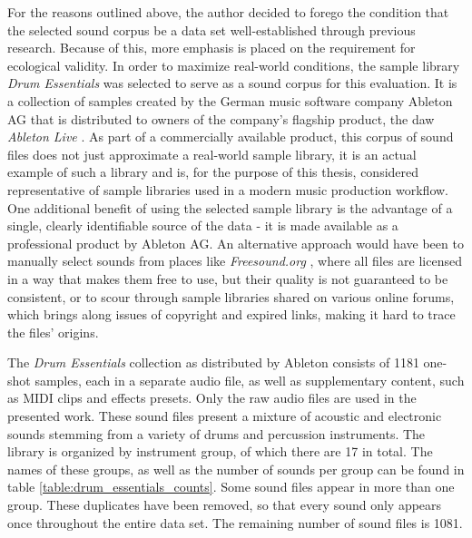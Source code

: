 For the reasons outlined above, the author decided to forego the condition that
the selected sound corpus be a data set well-established through previous
research. Because of this, more emphasis is placed on the requirement for
ecological validity. In order to maximize real-world conditions, the sample
library \textit{Drum Essentials} \citep{drumessentials2019} was selected to
serve as a sound corpus for this evaluation. It is a collection of samples
created by the German music software company Ableton AG that is distributed to
owners of the company's flagship product, the \gls{daw} \textit{Ableton Live}
\citep{abletonlive2019}. As part of a commercially available product, this
corpus of sound files does not just approximate a real-world sample library, it
is an actual example of such a library and is, for the purpose of this thesis,
considered representative of sample libraries used in a modern music production
workflow. One additional benefit of using the selected sample library is the
advantage of a single, clearly identifiable source of the data - it is made
available as a professional product by Ableton AG. An alternative approach would
have been to manually select sounds from places like \textit{Freesound.org}
\citep{font2013}, where all files are licensed in a way that makes them free to
use, but their quality is not guaranteed to be consistent, or to scour through
sample libraries shared on various online forums, which brings along issues of
copyright and expired links, making it hard to trace the files' origins.

\smallskip

The \textit{Drum Essentials} collection as distributed by Ableton consists of
1181 one-shot samples, each in a separate audio file, as well as supplementary
content, such as MIDI clips and effects presets. Only the raw audio files are
used in the presented work. These sound files present a mixture of acoustic
and electronic sounds stemming from a variety of drums and percussion
instruments. The library is organized by instrument group, of which there are
17 in total. The names of these groups, as well as the number of sounds per
group can be found in table \ref{table:drum_essentials_counts}. Some sound files
appear in more than one group. These duplicates have been removed, so that every
sound only appears once throughout the entire data set. The remaining number of
sound files is 1081.

\renewcommand{\arraystretch}{1.2}


